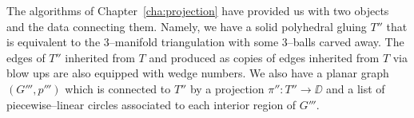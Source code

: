 The algorithms of Chapter~\ref{cha:projection} have provided us with two objects and the data connecting them.
Namely, we have a solid polyhedral gluing $T''$ that is equivalent to the 3--manifold triangulation with some 3--balls carved away.
The edges of $T''$ inherited from $T$ and produced as copies of edges inherited from $T$ via blow ups are also equipped with wedge numbers.
We also have a planar graph $(G''',p''')$ which is connected to $T''$ by a projection $\pi'':T''\to\DD$ and a list of piecewise--linear circles associated to each interior region of $G'''$.


